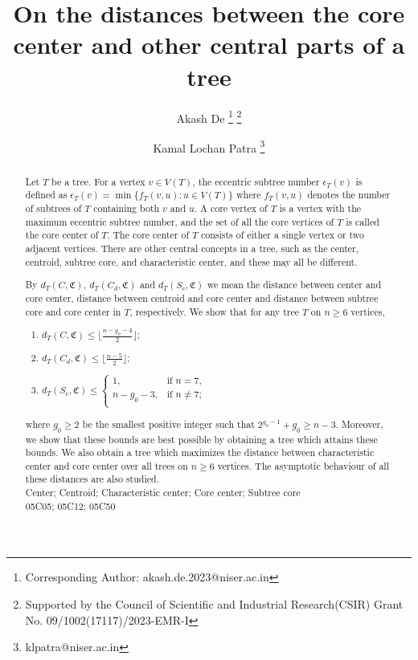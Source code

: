 \documentclass[11pt]{article}
\begin{document}
\title{\bf On the distances between the core center and other central parts of a tree}

\author[1]{Akash De \thanks{Corresponding Author: akash.de.2023@niser.ac.in} \thanks{Supported by the Council of Scientific and Industrial Research(CSIR) Grant No. 09/1002(17117)/2023-EMR-I} }
\author[2]{Kamal Lochan Patra \thanks{klpatra@niser.ac.in} }
\date{}
\maketitle
\begin{abstract}
Let $T$ be a tree. For a vertex $v\in V(T)$, the  eccentric subtree number $\epsilon_T(v)$ is defined as $\epsilon_T(v)=\min\{f_T(v,u): u\in V(T)\}$ where $f_T(v,u)$ denotes the number of subtrees of $T$ containing both $v$ and $u$. A  core vertex of $T$ is a vertex with the maximum eccentric subtree number, and the set of all the core vertices of $T$ is called the  core center of $T$. The core center of $T$ consists of either a single vertex or two adjacent vertices. There are other central concepts in a tree, such as the center, centroid, subtree core, and characteristic center, and these may all be different.
 
By $d_T(C, \mathfrak{C})$, $d_T(C_d, \mathfrak{C})$ and $d_T(S_c, \mathfrak{C})$ we mean the distance between center and core center, distance between centroid and core center and distance between subtree core and core center in $T$, respectively. We show that for any tree $T$ on $n\geq 6$ vertices,
\begin{enumerate}
\item[(i)]$d_T(C,\mathfrak{C})\leq \lfloor \frac{n-g_0-4}{2} \rfloor$;
\item[(ii)]$d_T(C_d,\mathfrak{C})\leq \lfloor \frac{n-5}{2} \rfloor$;
\item[(iii)] $d_T(S_c,\mathfrak{C})\leq\left\{
\begin{array}{ll}
 1,  &\text{if $n=7$,}\\
 n-g_0-3, &\text{if $n\neq 7$;}\\
\end{array}
\right.$
\end{enumerate}
where $g_0\geq 2$ be the smallest positive integer such that $2^{g_0-1}+g_0\geq n-3$. Moreover, we show that these bounds are best possible by obtaining a tree which attains these bounds. We also obtain a tree which maximizes the distance between characteristic center and core center over all trees on $n\geq 6$ vertices. The asymptotic behaviour of all these distances are also studied.\\

 Center; Centroid; Characteristic center; Core center; Subtree core\\

  05C05; 05C12; 05C50
\end{abstract}
\end{document}
